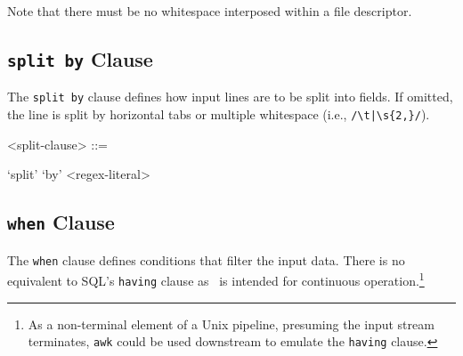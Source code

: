 Note that there must be no whitespace interposed within a file
descriptor.

\subsection{\texttt{split by} Clause}

The \texttt{split by} clause defines how input lines are to be split
into fields. If omitted, the line is split by horizontal tabs or
multiple whitespace (i.e.,
\texttt{/\textbackslash{}t|\textbackslash{}s\{2,\}/}).

\begin{grammar}
  <split-clause> ::= \begin{syntdiag}
    `split' `by' <regex-literal>
  \end{syntdiag}
\end{grammar}

\subsection{\texttt{when} Clause}

The \texttt{when} clause defines conditions that filter the input data.
There is no equivalent to SQL's \texttt{having} clause as \stag\ is
intended for continuous operation.\footnote{As a non-terminal element of
a Unix pipeline, presuming the input stream terminates, \texttt{awk}
could be used downstream to emulate the \texttt{having} clause.}

